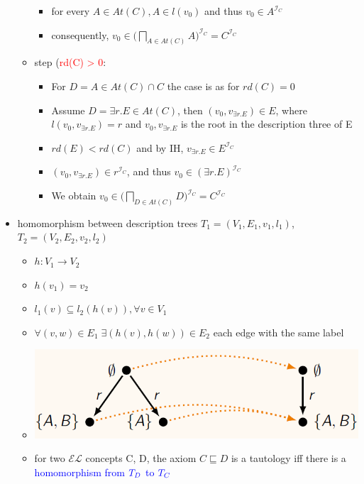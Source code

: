 \documentclass[12pt,a4paper]{article}
\newcommand{\red}[1]{\textcolor{red} {#1}}
\newcommand{\blue}[1]{\textcolor{blue} {#1}}
\newcommand{\sse}{\sqsubseteq}
\begin{document}
\begin{itemize}
\begin{itemize}
\begin{itemize}
\item for every $A\in At(C), A\in l(v_0)$ and thus $v_0 \in A^{\mathcal{I}_C}$
\item consequently, $\displaystyle v_0 \in \bigg(\bigsqcap_{A\in At(C)} A\bigg)^{\mathcal{I}_C} = C^{\mathcal{I}_C}$
\end{itemize}
\item step (\red{rd(C) > 0}:
\begin{itemize}
\item For $D=A \in At(C) \cap C$ the case is as for $rd(C) = 0$
\item Assume $D =\exists r.E\in At(C)$, then $(v_0, v_{\exists r.E}) \in E$, where $l(v_0, v_{\exists r.E}) = r$ and $v_0, v_{\exists r.E}$ is the root in the description three of E
\item $rd(E) < rd(C)$ and by IH, $v_{\exists r.E} \in E^{\mathcal{I}_C}$
\item $(v_0, v_{\exists r.E}) \in r^{\mathcal{I}_C}$, and thus $v_0 \in (\exists r.E)^{\mathcal{I}_C}$
\item We obtain $\displaystyle v_0 \in \bigg( \bigsqcap_{D\in At(C)} D \bigg)^{\mathcal{I}_C} = C^{\mathcal{I}_C}$
\end{itemize}
\end{itemize}
\item homomorphism between description trees $T_1 = (V_1, E_1, v_1, l_1)$, $T_2 = (V_2, E_2, v_2, l_2)$
\begin{itemize}
\item $h: V_1 \rightarrow V_2$
\item $h(v_1) = v_2$
\item $l_1(v) \subseteq l_2(h(v)), \forall v\in V_1$
\item $\forall (v,w) \in E_1\; \exists (h(v), h(w)) \in E_2$ each edge with the same label
\item \includegraphics[scale=0.5]{./resources/homomorphism.PNG}
\item for two $\mathcal{EL}$ concepts C, D, the axiom $C\sse D$ is a tautology iff there is a \blue{homomorphism from} $\blue{T_D}$  \blue{to} $\blue{T_C}$
\end{itemize}

\end{itemize}
\end{document}
